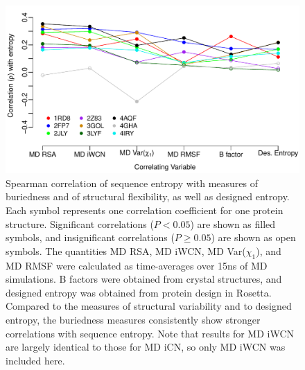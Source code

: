 \documentclass[smallextended]{svjour3}
\begin{document}
\begin{figure}[tbh]
\begin{center}
    \includegraphics[width=5in]{cor_entropy_all.pdf}
\end{center}
\caption{Spearman correlation of sequence entropy with measures of buriedness and of structural flexibility, as well as designed entropy. Each symbol represents one correlation coefficient for one protein structure. Significant correlations ($P<0.05$) are shown as filled symbols, and insignificant correlations ($P\geq0.05$) are shown as open symbols. The quantities MD RSA, MD iWCN, MD Var($\chi_1$), and MD RMSF were calculated as time-averages over 15ns of MD simulations. B factors were obtained from crystal structures, and designed entropy was obtained from protein design in Rosetta. Compared to the measures of structural variability and to designed entropy, the buriedness measures consistently show stronger correlations with sequence entropy. Note that results for MD iWCN are largely identical to those for MD iCN, so only MD iWCN was included here.}
\label{fig:cor_entropy_all}
\end{figure}
\end{document}
